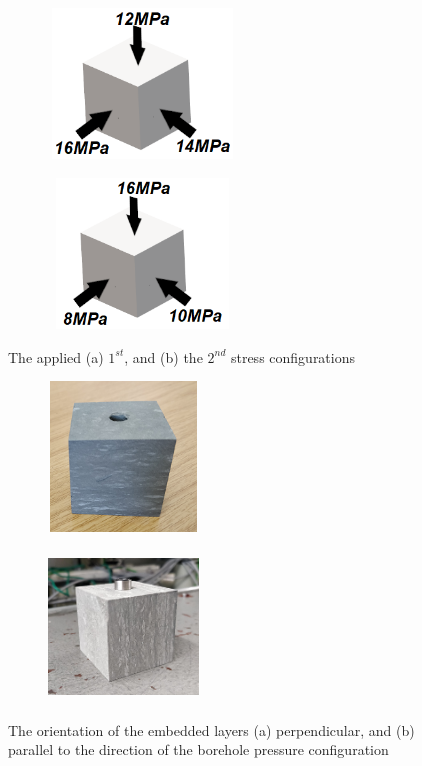 \begin{figure}[!ht]
\begin{subfigure}[c]{0.48\textwidth}
\centering
\includegraphics[width=5cm,height=4cm]{figures/Amir_Percolation_Stress_1.png}
\subcaption{}
\label{fig:Amir_Percolation_Stress_1}
\end{subfigure}
\hfill
\begin{subfigure}[c]{0.48\textwidth}
\centering
\includegraphics[width=5cm,height=4cm]{figures/Amir_Percolation_Stress_2.png}
\subcaption{}
\label{fig:Amir_Percolation_Stress_2}
\end{subfigure}
\caption{The applied (a) $1^{st}$, and (b) the $2^{nd}$ stress configurations}
\end{figure}

\begin{figure}[!ht]
\begin{subfigure}[c]{0.48\textwidth}
\centering
\includegraphics[width=4cm,height=4cm]{figures/Amir_Percolation_Orientation1.png}
\subcaption{}
\label{fig:Amir_Percolation_Orientation1}
\end{subfigure}
\hfill
\begin{subfigure}[c]{0.48\textwidth}
\centering
\includegraphics[width=4cm,height=4cm]{figures/Amir_Percolation_Orientation2.png}
\subcaption{}
\label{fig:Amir_Percolation_Orientation2}
\end{subfigure}
\caption{The orientation of the embedded layers (a) perpendicular, and (b) parallel to the direction of the borehole pressure configuration}
\end{figure}

